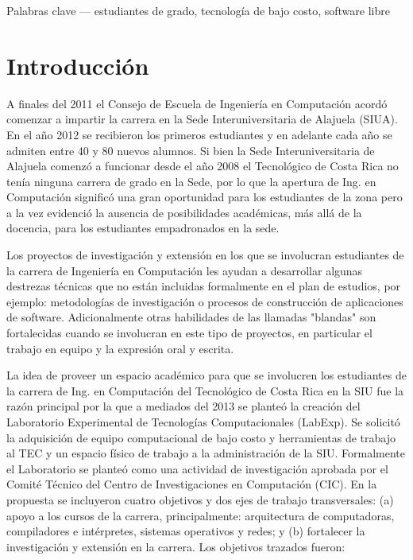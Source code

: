 \documentclass[conference]{IEEEtran}
\begin{document}
Palabras clave — estudiantes de grado, tecnología de bajo costo, software libre



%
\IEEEpeerreviewmaketitle



\section{Introducción}

A finales del 2011 el Consejo de Escuela de Ingeniería en Computación acordó
comenzar a impartir la carrera en la Sede Interuniversitaria de Alajuela (SIUA).
En el año 2012 se recibieron los primeros estudiantes y en adelante cada año se
admiten entre 40 y 80 nuevos alumnos. Si bien la Sede Interuniversitaria de
Alajuela comenzó a funcionar desde el año 2008 el Tecnológico de Costa Rica no
tenía ninguna carrera de grado en la Sede, por lo que la apertura de Ing. en
Computación significó una gran oportunidad para los estudiantes de la zona pero
a la vez evidenció la ausencia de posibilidades académicas, más allá de la
docencia, para los estudiantes empadronados en la sede. 

Los proyectos de investigación y extensión en los que se involucran estudiantes
de la carrera de Ingeniería en Computación les ayudan a desarrollar algunas
destrezas técnicas que no están incluidas formalmente en el plan de estudios,
por ejemplo: metodologías de investigación o procesos de construcción de
aplicaciones de software. Adicionalmente otras habilidades de las llamadas
"blandas" son fortalecidas cuando se involucran en este tipo de proyectos, en
particular el trabajo en equipo y la expresión oral y escrita. 

La idea de proveer un espacio académico para que se involucren los estudiantes
de la carrera de Ing. en Computación del Tecnológico de Costa Rica en la SIU fue
la razón principal por la que a mediados del 2013 se planteó la creación del
Laboratorio Experimental de Tecnologías Computacionales (LabExp). Se solicitó la
adquisición de equipo computacional de bajo costo y herramientas de trabajo al
TEC y un espacio físico de trabajo a la administración de la SIU. Formalmente el
Laboratorio se planteó como una actividad de investigación aprobada por el
Comité Técnico del Centro de Investigaciones en Computación (CIC). En la
propuesta se incluyeron cuatro objetivos y dos ejes de trabajo transversales:
(a) apoyo a los cursos de la carrera, principalmente: arquitectura de
computadoras, compiladores e intérpretes, sistemas operativos y redes; y (b)
fortalecer la investigación y extensión en la carrera. Los objetivos trazados
fueron:
\end{document}
